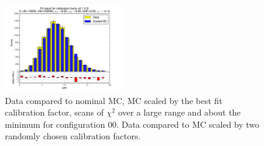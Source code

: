 \begin{figure}[htbp]
\begin{center}
\includegraphics[width=0.45\textwidth]{../FIGURES/00/FIG_Fit_result_for_calibration_factor_of_1_015.pdf} 
\caption{Data compared to nominal MC, MC scaled by the best fit calibration factor, scans of $\chi^2$ over a large range and about the minimum for configuration 00. Data compared to MC scaled by two randomly chosen calibration factors.} 
\label{tab:best_00} 
\end{center} \end{figure} 

